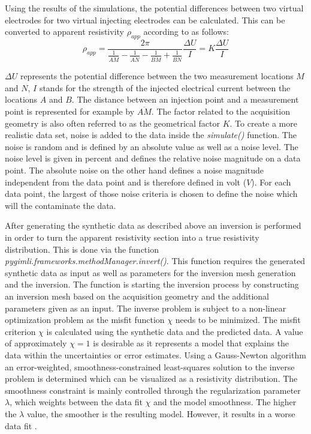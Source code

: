 Using the results of the simulations, the potential differences between two virtual electrodes for two virtual injecting electrodes can be calculated. This can be converted to apparent resistivity $\rho_{app}$ according to \citet{kearey2002introduction} as follows:
\begin{equation}
    \rho_{app} = \frac{2\pi}{\frac{1}{\overline{AM}}-\frac{1}{\overline{AN}}-\frac{1}{\overline{BM}}+\frac{1}{\overline{BN}}} \frac{\Delta U}{I} = K \frac{\Delta U}{I}
    \label{Eq:rho_app}
\end{equation}

$\Delta U$ represents the potential difference between the two measurement locations $M$ and $N$, $I$ stands for the strength of the injected electrical current between the locations $A$ and $B$. The distance between an injection point and a measurement point is represented for example by $\overline{AM}$. The factor related to the acquisition geometry is also often referred to as the geometrical factor $K$. To create a more realistic data set, noise is added to the data inside the \textit{simulate()} function. The noise is random and is defined by an absolute value as well as a noise level. The noise level is given in percent and defines the relative noise magnitude on a data point. The absolute noise on the other hand defines a noise magnitude independent from the data point and is therefore defined in volt ($V$). For each data point, the largest of those noise criteria is chosen to define the noise which will the contaminate the data.

After generating the synthetic data as described above an inversion is performed in order to turn the apparent resistivity section into a true resistivity distribution. This is done via the function \textit{pygimli.frameworks.methodManager.invert()}. This function requires the generated synthetic data as input as well as parameters for the inversion mesh generation and the inversion. The function is starting the inversion process by constructing an inversion mesh based on the acquisition geometry and the additional parameters given as an input. The inverse problem is subject to a non-linear optimization problem as the misfit function $\chi$ needs to be minimized. The misfit criterion $\chi$ is calculated using the synthetic data and the predicted data. A value of approximately $\chi=1$ is desirable as it represents a model that explains the data within the uncertainties or error estimates. Using a Gauss-Newton algorithm an error-weighted, smoothness-constrained least-squares solution to the inverse problem is determined which can be visualized as a resistivity distribution. The smoothness constraint is mainly controlled through the regularization parameter $\lambda$, which weights between the data fit $\chi$ and the model smoothness. The higher the $\lambda$ value, the smoother is the resulting model. However, it results in a worse data fit \citep{Ruecker2017}.

